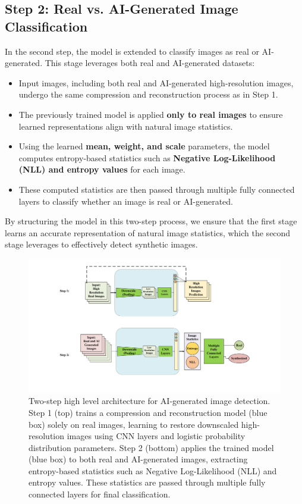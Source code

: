 \documentclass{article} %
\begin{document}
\subsection{Step 2: Real vs. AI-Generated Image Classification}
In the second step, the model is extended to classify images as real or AI-generated. This stage leverages both real and AI-generated datasets:
\begin{itemize}
    \item Input images, including both real and AI-generated high-resolution images, undergo the same compression and reconstruction process as in Step 1.
    \item The previously trained model is applied \textbf{only to real images} to ensure learned representations align with natural image statistics.
    \item Using the learned \textbf{mean, weight, and scale} parameters, the model computes entropy-based statistics such as \textbf{Negative Log-Likelihood (NLL) and entropy values} for each image.
    \item These computed statistics are then passed through multiple fully connected layers to classify whether an image is real or AI-generated.
\end{itemize}

By structuring the model in this two-step process, we ensure that the first stage learns an accurate representation of natural image statistics, which the second stage leverages to effectively detect synthetic images.

\begin{figure}[htbp]
    \centering
    \includegraphics[width=\linewidth]{Fig/high_level_architecture.pdf}
    \caption{Two-step high level architecture for AI-generated image detection. Step 1 (top) trains a compression and reconstruction model (blue box) solely on real images, learning to restore downscaled high-resolution images using CNN layers and logistic probability distribution parameters. Step 2 (bottom) applies the trained model (blue box) to both real and AI-generated images, extracting entropy-based statistics such as Negative Log-Likelihood (NLL) and entropy values. These statistics are passed through multiple fully connected layers for final classification.}
\end{figure}
\end{document}
